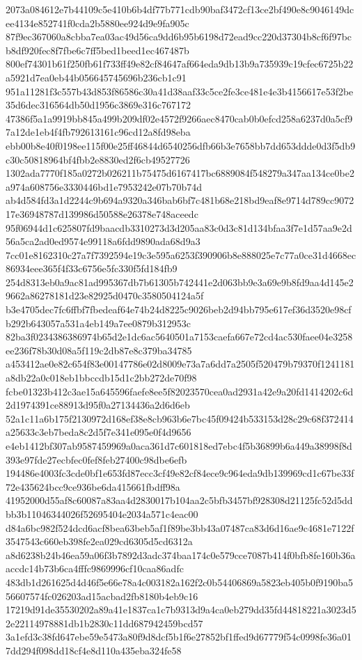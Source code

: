 \documentclass[11pt,a4paper]{article}
\begin{document}
{2073a084612e7b44109c5e410b6b4df77b771cdb90baf3472cf13ce2bf490e8c9046149dcee4134e852741f0cda2b5880ee924d9e9fa905c
87f9ec367060a8cbba7ea03ac49d56ca9dd6b95b6198d72ead9cc220d37304b8cf6f97bcb8df920fec8f7fbe6c7ff5bed1beed1ec467487b
800ef74301b61f250fb61f733ff49e82cf84647af664eda9db13b9a735939c19cfec6725b22a5921d7ea0eb44b056645745696b236cb1c91
951a11281f3c557b43d853f86586c30a41d38aaf33c5ce2fe3ce481e4e3b4156617e53f2be35d6dec316564db50d1956c3869e316c767172
47386f5a1a9919bb845a499b209df02e4572f9266aec8470cab0b0efcd258a6237d0a5cf97a12de1eb4f4fb792613161c96cd12a8fd98eba
ebb00b8e40f0198ee115f00e25ff46844d6540256dfb66b3e7658bb7dd653ddde0d3f5db9c30c50818964bf4fbb2e8830ed2f6cb49527726
1302ada7770f185a0272b026211b75475d6167417bc6889084f548279a347aa134ce0be2a974a608756e3330446bd1e7953242e07b70b74d
ab4d584fd3a1d2244c9b694a9320a346bab6bf7c481b68e218bd9eaf8e9714d789cc907217e36948787d139986d50588e26378e748aceedc
95f06944d1c625807fd9baacdb3310273d3d205aa83c0d3c81d134bfaa3f7e1d57aa9e2d56a5ca2ad0ed9574e99118a6fdd9890ada68d9a3
7cc01e8162310c27a7f7392594e19c3e595a6253f390906b8e888025e7c77a0ce31d4668ec86934eee365f4f33c6756e5fc330f5fd184fb9
254d8313eb0a9ac81ad995367db7b61305b742441e2d063bb9e3a69e9b8fd9aa4d145e29662a86278181d23e82925d0470c3580504124a5f
b3e4705dec7fc6ffbf7fbedeaf64e74b24d8225c9026beb2d94bb795e617ef36d3520e98cfb292b643057a531a4eb149a7ee0879b312953c
82ba3f0234386386974b65d2e1dc6ac5640501a7153caefa667e72cd4ac530faee04e3258ee236f78b30d08a5f119c2db87e8c379ba34785
a453412ae0e82c654f83e00147786e02d8009e73a7a6dd7a2505f520479b79370f1241181a8db22a0c018eb1bbccdb15d1c2bb272de70f98
fcbe01323b412c3ae15a645596faefe8ee5f82023570cea0ad2931a42e9a20fd1414202c6d2d1974391ce88913d95f0a27134436a2d6d6eb
52a1c11a6b175f2130972d168ef38e8cb963b6e7bc45f09424b533153d28c29c68f372414a25633c3eb7beda8c2d5f7e341e095e0f4d9656
e4eb1412bf307ab9587459969a0aca361d7c601818ed7ebc4f5b36899b6a449a38998f8d393e97fde27ecbfec0fef8feb27400c98dbe6efb
194486e4003fc3cde0bf1e653fd87ecc3cf49e82cf84ece9c964eda9db139969cd1c67be33f72e435624bcc9ce936be6da415661fbdff98a
41952000d55af8c60087a83aa4d2830017b104aa2c5bfb3457bf928308d21125fc52d5ddbb3b11046344026f52695404e2034a571c4eac00
d84a6bc982f524dcd6acf8bea63beb5af1f89be3bb43a07487ca83d6d16ae9c4681e7122f3547543c660eb398fe2ea029cd6305d5cd6312a
a8d6238b24b46ea59a06f3b7892d3adc374baa174c0e579cce7087b414f0bfb8fe160b36aaccdc14b73b6ca4fffc9869996cf10caa86adfc
483db1d261625d4d46f5e66e78a4c003182a162f2c0b54406869a5823eb405b0f9190ba556607574fc026203ad15acbad2fb8180b4eb9c16
17219d91de35530202a89a41e1837ca1c7b9313d9a4ca0eb279dd35fd44818221a3023d52e22114978881db1b2830c11dd687942459bcd57
3a1efd3c38fd647ebe59e5473a80f9d8dcf5b1f6e27852bf1ffed9d67779f54c0998fe36a017dd294f098dd18cf4e8d110a435eba324fe58
}
\end{document}
